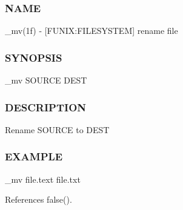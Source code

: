 \subsubsection*{N\+A\+ME}

\+\_\+mv(1f) -\/ \mbox{[}F\+U\+N\+IX\+:F\+I\+L\+E\+S\+Y\+S\+T\+EM\mbox{]} rename file \subsubsection*{S\+Y\+N\+O\+P\+S\+IS}

\+\_\+mv S\+O\+U\+R\+CE D\+E\+ST \subsubsection*{D\+E\+S\+C\+R\+I\+P\+T\+I\+ON}

Rename S\+O\+U\+R\+CE to D\+E\+ST

\subsubsection*{E\+X\+A\+M\+P\+LE}

\begin{DoxyVerb}  _mv file.text file.txt \end{DoxyVerb}
 

References false().

